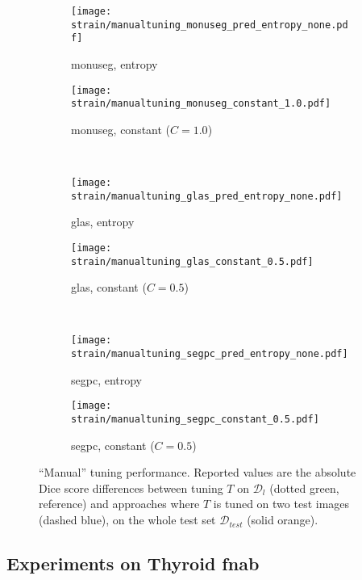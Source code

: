 \begin{figure}
  \centering
  \begin{subfigure}{0.48\textwidth}
    \centering
    \texttt{[image: strain/manualtuning\_monuseg\_pred\_entropy\_none.pdf]}
    \caption{\acrshort{monuseg}, entropy}
    \label{sfig:strain:manual:monu_entropy}
  \end{subfigure}
  \begin{subfigure}{0.48\textwidth}
    \centering
    \texttt{[image: strain/manualtuning\_monuseg\_constant\_1.0.pdf]}
    \caption{\acrshort{monuseg}, constant ($C=1.0$)}
    \label{sfig:strain:manual:monu_constant}
  \end{subfigure} \\
  \begin{subfigure}{0.48\textwidth}
    \centering
    \texttt{[image: strain/manualtuning\_glas\_pred\_entropy\_none.pdf]}
    \caption{\acrshort{glas}, entropy}
    \label{sfig:strain:manual:_glas_pred_entropy_none}
  \end{subfigure}
  \begin{subfigure}{0.48\textwidth}
    \centering
    \texttt{[image: strain/manualtuning\_glas\_constant\_0.5.pdf]}
    \caption{\acrshort{glas}, constant ($C=0.5$)}
    \label{sfig:strain:manual:_glas_constant}
  \end{subfigure} \\
  \begin{subfigure}{0.48\textwidth}
    \centering
    \texttt{[image: strain/manualtuning\_segpc\_pred\_entropy\_none.pdf]}
    \caption{\acrshort{segpc}, entropy}
    \label{sfig:strain:manual:_segpc_pred_entropy_none}
  \end{subfigure}
  \begin{subfigure}{0.48\textwidth}
    \centering
    \texttt{[image: strain/manualtuning\_segpc\_constant\_0.5.pdf]}
    \caption{\acrshort{segpc}, constant ($C=0.5$)}
    \label{sfig:strain:manual:_segpc_constant}
  \end{subfigure}
  \caption{``Manual'' tuning performance. Reported values are the absolute Dice score differences between tuning $T$ on $\mathcal{D}_l$ (dotted green, reference) and approaches where $T$ is tuned on two test images (dashed blue), on the whole test set $\mathcal{D}_{test}$ (solid orange).}
  \label{fig:strain:manualtuning}

\end{figure}


\subsection{Experiments on Thyroid \acrshort{fnab}}
\label{ssec:strain:thyroid_exp}

